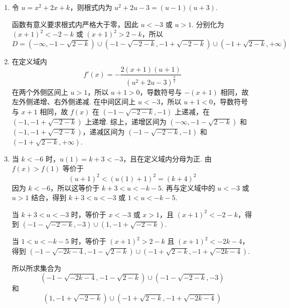 \begin{solution}
\begin{enumerate}
\item
令 \(u=x^2+2x+k\)，则根式内为 \(u^2+2u-3=(u-1)(u+3)\).

函数有意义要求根式内严格大于零，因此 \(u<-3\) 或 \(u>1\). 分别化为
\( (x+1)^2<-2-k\) 或 \((x+1)^2>2-k\)，所以
\[
D=\left(-\infty,-1-\sqrt{2-k}\right)\cup\left(-1-\sqrt{-2-k},-1+\sqrt{-2-k}\right)\cup\left(-1+\sqrt{2-k},+\infty\right)
\]

\item 在定义域内
\[
f'(x)=-\frac{2(x+1)(u+1)}{\left(u^2+2u-3\right)^{\frac{3}{2}}}
\]
在两个外侧区间上 \(u>1\)，所以 \(u+1>0\)，导数符号与 \(-(x+1)\) 相同，故左外侧递增、右外侧递减. 在中间区间上 \(u<-3\)，所以 \(u+1<0\)，导数符号与 \(x+1\) 相同，故
\(f(x)\) 在 \(\left(-1-\sqrt{-2-k},-1\right)\) 上递减，在 \(\left(-1,-1+\sqrt{-2-k}\right)\) 上递增. 综上，递增区间为
\(\left(-\infty,-1-\sqrt{2-k}\right)\) 和 \(\left(-1,-1+\sqrt{-2-k}\right)\)，递减区间为
\(\left(-1-\sqrt{-2-k},-1\right)\) 和 \(\left(-1+\sqrt{2-k},+\infty\right)\).

\item 当 \(k<-6\) 时，\(u(1)=k+3<-3\)，且在定义域内分母为正. 由
\(f(x)>f(1)\) 等价于
\[
(u+1)^2<(u(1)+1)^2=(k+4)^2
\]
因为 \(k<-6\)，所以这等价于 \(k+3<u<-k-5\). 再与定义域中的 \(u<-3\) 或 \(u>1\) 结合，得到
\(k+3<u<-3\) 或 \(1<u<-k-5\).

当 \(k+3<u<-3\) 时，等价于 \(x<-3\) 或 \(x>1\)，且 \((x+1)^2<-2-k\)，得到
\(\left(-1-\sqrt{-2-k},-3\right)\cup\left(1,-1+\sqrt{-2-k}\right)\).

当 \(1<u<-k-5\) 时，等价于 \((x+1)^2>2-k\) 且 \((x+1)^2<-2k-4\)，得到
\(\left(-1-\sqrt{-2k-4},-1-\sqrt{2-k}\right)\cup\left(-1+\sqrt{2-k},-1+\sqrt{-2k-4}\right)\).

所以所求集合为
\[
\left(-1-\sqrt{-2k-4},-1-\sqrt{2-k}\right)\cup\left(-1-\sqrt{-2-k},-3\right)
\]
和
\[
\left(1,-1+\sqrt{-2-k}\right)\cup\left(-1+\sqrt{2-k},-1+\sqrt{-2k-4}\right)
\]
\end{enumerate}
\end{solution}
